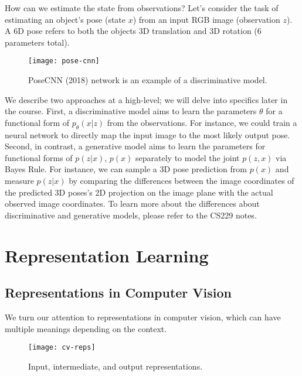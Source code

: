 \documentclass[12pt]{article}
\begin{document}
How can we estimate the state from observations? Let's consider the task of estimating an object's pose (state $x$) from an input RGB image (observation $z$). A 6D pose refers to both the objects 3D translation and 3D rotation (6 parameters total). 

\begin{figure}[H]
  \caption{PoseCNN (2018) network is an example of a discriminative model.}
  \centering
\texttt{[image: pose-cnn]}
\end{figure}


We describe two approaches at a high-level; we will delve into specifics later in the course. First, a discriminative model aims to learn the parameters $\theta$ for a functional form of $p_{\theta}(x|z)$ from the observations. For instance, we could train a neural network to directly map the input image to the most likely output pose. Second, in contrast, a generative model aims to learn the parameters for functional forms of $p(z|x)$, $p(x)$ separately to model the joint $p(z, x)$ via Bayes Rule. For instance, we can sample a 3D pose prediction from $p(x)$ and measure $p(z|x)$ by comparing the differences between the image coordinates of the predicted 3D poses's 2D projection on the image plane with the actual observed image coordinates. To learn more about the differences about discriminative and generative models, please refer to the CS229 notes.

\section*{Representation Learning}

\subsection*{Representations in Computer Vision}

We turn our attention to representations in computer vision, which can have multiple meanings depending on the context. 

\begin{figure}[H]
  \caption{Input, intermediate, and output representations.}
  \centering
\texttt{[image: cv-reps]}
\end{figure}
\end{document}
